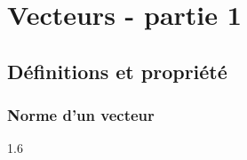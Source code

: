 \chapter{Vecteurs - partie 1}
\thispagestyle{fancy}

\section{Définitions et propriété}

\subsection{Norme d'un vecteur}

    \begin{bdefi}
        \begin{spacing}{1.6}
        	\dotfill \\
        	\pointille[\textwidth]
        \end{spacing}
    \end{bdefi}
    
